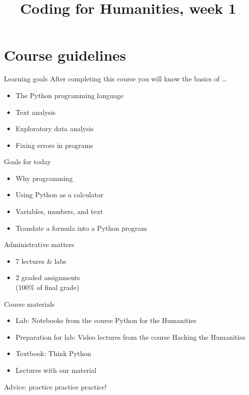 \documentclass[aspectratio=169,usenames,dvipsnames]{beamer}
\title{Coding for Humanities, week 1}
\begin{document}
\begin{frame}
 \titlepage
\end{frame}

\begin{frame}
 \tableofcontents
\end{frame}


\section{Course guidelines}
\frame{\tableofcontents[currentsection]}

\begin{frame}{Learning goals}
   After completing this course you will know the basics of \dots
   \begin{itemize}
       \item The Python programming language
       \item Text analysis
       \item Exploratory data analysis
       \item Fixing errors in programs
   \end{itemize}
\end{frame}

\begin{frame}{Goals for today}
    \begin{itemize}
        \item Why programming
        \item Using Python as a calculator
        \item Variables, numbers, and text
        \item Translate a formula into a Python program
    \end{itemize}
\end{frame}

\begin{frame}{Administrative matters}
    \begin{itemize}
        \item 7 lectures \& labs
        \item 2 graded assignments \\
            (100\% of final grade)
    \end{itemize}
\end{frame}

\begin{frame}{Course materials}
    \begin{itemize}
        \item Lab: Notebooks from the course Python for the Humanities
        \item Preparation for lab: Video lectures from the course Hacking the Humanities
		\item Textbook: Think Python
        \item Lectures with our material
    \end{itemize}

	\pause\vspace{1em}
	Advice: practice practice practice!
\end{frame}
\end{document}
